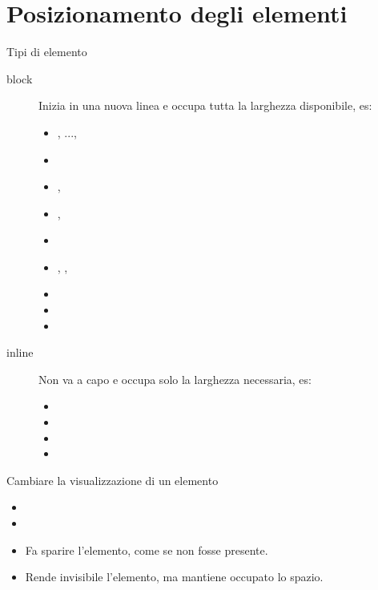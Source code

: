 \section[Posizioni]{Posizionamento degli elementi}

\begin{frame}{Tipi di elemento}\transfade\centering
  \begin{description}
    \item[block] Inizia in una nuova linea e occupa tutta la larghezza disponibile, es:
      \begin{itemize}
        \item {}, ..., 
        \item {}
        \item {}, 
        \item {}, 
        \item {}
        \item {}, , 
        \item {}
        \item {}
        \item {}
      \end{itemize}
    \item[inline] Non va a capo e occupa solo la larghezza necessaria, es:
    \begin{itemize}
      \item {}
      \item {}
      \item {}
      \item {}
    \end{itemize}
  \end{description}
\end{frame}

\begin{frame}{Cambiare la visualizzazione di un elemento}\transfade\centering
  \begin{itemize}
    \item{}
    \item{}
    \item{} Fa sparire l'elemento, come se non fosse presente.
    \item{} Rende invisibile l'elemento, ma mantiene occupato lo spazio.
  \end{itemize}
\end{frame}

